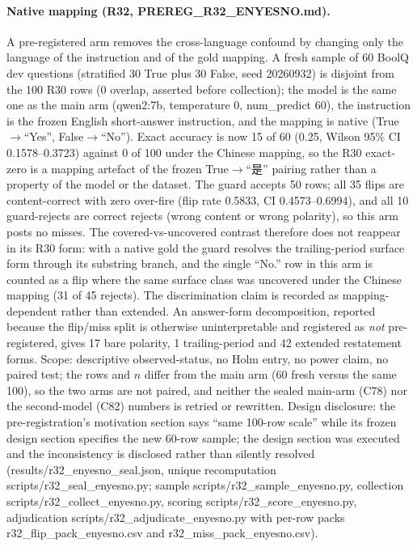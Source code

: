 \documentclass[10pt]{article} %
\begin{document}
\paragraph*{Native mapping (R32, PREREG\_R32\_ENYESNO.md).} A pre-registered arm removes the cross-language confound by changing only the language of the instruction and of the gold mapping. A fresh sample of 60 BoolQ dev questions (stratified 30 True plus 30 False, seed 20260932) is disjoint from the 100 R30 rows (0 overlap, asserted before collection); the model is the same one as the main arm (qwen2:7b, temperature 0, num\_predict 60), the instruction is the frozen English short-answer instruction, and the mapping is native (True$\to$``Yes'', False$\to$``No''). Exact accuracy is now 15 of 60 (0.25, Wilson 95\% CI 0.1578--0.3723) against 0 of 100 under the Chinese mapping, so the R30 exact-zero is a mapping artefact of the frozen True$\to$``是'' pairing rather than a property of the model or the dataset. The guard accepts 50 rows; all 35 flips are content-correct with zero over-fire (flip rate 0.5833, CI 0.4573--0.6994), and all 10 guard-rejects are correct rejects (wrong content or wrong polarity), so this arm posts no misses. The covered-vs-uncovered contrast therefore does not reappear in its R30 form: with a native gold the guard resolves the trailing-period surface form through its substring branch, and the single ``No.'' row in this arm is counted as a flip where the same surface class was uncovered under the Chinese mapping (31 of 45 rejects). The discrimination claim is recorded as mapping-dependent rather than extended. An answer-form decomposition, reported because the flip/miss split is otherwise uninterpretable and registered as \emph{not} pre-registered, gives 17 bare polarity, 1 trailing-period and 42 extended restatement forms. Scope: descriptive observed-status, no Holm entry, no power claim, no paired test; the rows and $n$ differ from the main arm (60 fresh versus the same 100), so the two arms are not paired, and neither the sealed main-arm (C78) nor the second-model (C82) numbers is retried or rewritten. Design disclosure: the pre-registration's motivation section says ``same 100-row scale'' while its frozen design section specifies the new 60-row sample; the design section was executed and the inconsistency is disclosed rather than silently resolved (results/r32\_enyesno\_seal.json, unique recomputation scripts/r32\_seal\_enyesno.py; sample scripts/r32\_sample\_enyesno.py, collection scripts/r32\_collect\_enyesno.py, scoring scripts/r32\_score\_enyesno.py, adjudication scripts/r32\_adjudicate\_enyesno.py with per-row packs r32\_flip\_pack\_enyesno.csv and r32\_miss\_pack\_enyesno.csv).
\end{document}
